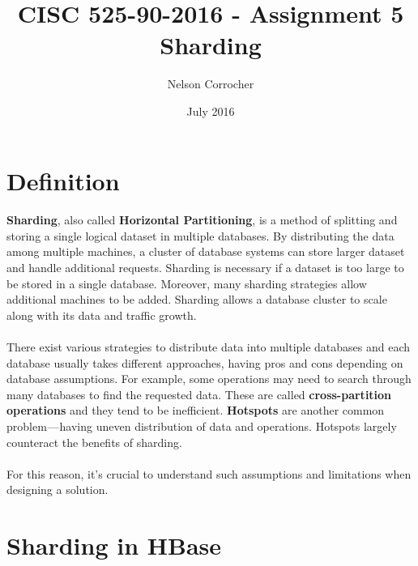 \documentclass[11pt, a4paper]{article}
\title{CISC 525-90-2016 - Assignment 5\\ Sharding}
\author{Nelson Corrocher}
\date{July 2016}
\begin{document}
\maketitle
\section{Definition}
\paragraph{}\textbf{Sharding}, also called \textbf{Horizontal Partitioning}, is a method of splitting and storing a single logical dataset in multiple databases. By distributing the data among multiple machines, a cluster of database systems can store larger dataset and handle additional requests. Sharding is necessary if a dataset is too large to be stored in a single database. Moreover, many sharding strategies allow additional machines to be added. Sharding allows a database cluster to scale along with its data and traffic growth.
\paragraph{}There exist various strategies to distribute data into multiple databases and each database usually takes different approaches, having pros and cons depending on database assumptions. For example, some operations may need to search through many databases to find the requested data. These are called \textbf{cross-partition operations} and they tend to be inefficient. \textbf{Hotspots} are another common problem — having uneven distribution of data and operations. Hotspots largely counteract the benefits of sharding.
\paragraph{}For this reason, it's crucial to understand such assumptions and limitations when designing a solution. 

\section{Sharding in HBase}  
\end{document}

